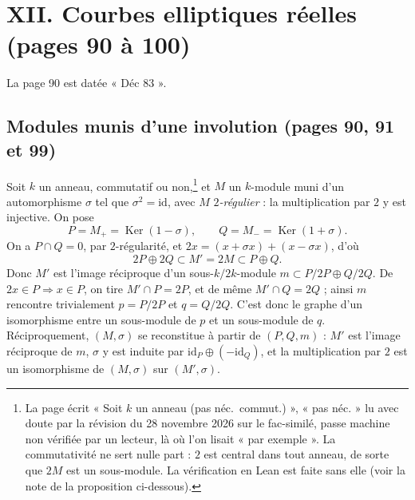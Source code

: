 \documentclass[11pt,a4paper]{article}
\begin{document}
\section*{XII. Courbes elliptiques réelles (pages 90 à 100)}

La page 90 est datée « Déc 83 ».

\subsection*{Modules munis d'une involution (pages 90, 91 et 99)}

Soit $k$ un anneau, commutatif ou non,\footnote{La page écrit « Soit $k$
un anneau (pas néc.\ commut.) », « pas néc. » lu avec doute par la révision du
28 novembre 2026 sur le fac-similé, passe machine non vérifiée par un lecteur,
là où l'on lisait « par exemple ». La
commutativité ne sert nulle part : $2$ est central dans tout anneau, de sorte
que $2M$ est un sous-module. La vérification en Lean est faite
sans elle (voir la note de la proposition ci-dessous).} et $M$ un $k$-module muni d'un automorphisme
$\sigma$ tel que $\sigma^{2} = \mathrm{id}$, avec $M$ \emph{$2$-régulier} :
la multiplication par $2$ y est injective. On pose
\[
P = M_{+} = \operatorname{Ker}(1 - \sigma), \qquad Q = M_{-} =
\operatorname{Ker}(1 + \sigma).
\]
On a $P \cap Q = 0$, par $2$-régularité, et $2x = (x + \sigma x) + (x -
\sigma x)$, d'où
\[
2P \oplus 2Q \subset M' = 2M \subset P \oplus Q.
\]
Donc $M'$ est l'image réciproque d'un sous-$k/2k$-module $m \subset P/2P
\oplus Q/2Q$. De $2x \in P \Rightarrow x \in P$, on tire $M' \cap P = 2P$, et
de même $M' \cap Q = 2Q$ ; ainsi $m$ rencontre trivialement $p = P/2P$ et
$q = Q/2Q$. C'est donc le graphe d'un isomorphisme entre un sous-module de
$p$ et un sous-module de $q$. Réciproquement, $(M, \sigma)$ se reconstitue à
partir de $(P, Q, m)$ : $M'$ est l'image réciproque de $m$, $\sigma$ y est
induite par $\mathrm{id}_P \oplus (-\mathrm{id}_Q)$, et la multiplication par
$2$ est un isomorphisme de $(M,\sigma)$ sur $(M', \sigma)$.
\end{document}
